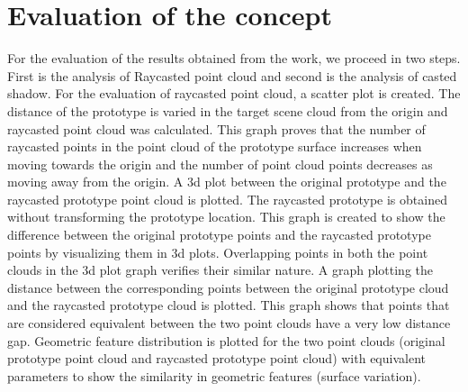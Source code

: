 \chapter{Evaluation of the concept}
For the evaluation of the results obtained from the work, we proceed in two steps. First is the analysis of Raycasted point cloud and second is the analysis of casted shadow. For the evaluation of raycasted point cloud, a scatter plot is created. The distance of the prototype is varied in the target scene cloud from the origin and raycasted point cloud was calculated. This graph proves that the number of raycasted points in the point cloud of the prototype surface increases when moving towards the origin and the number of point cloud points decreases as moving away from the origin. A 3d plot between the original prototype and the raycasted prototype point cloud is plotted. The raycasted prototype is obtained without transforming the prototype location. This graph is created to show the difference between the original prototype points and the raycasted prototype points by visualizing them in 3d plots. Overlapping points in both the point clouds in the 3d plot graph verifies their similar nature. A graph plotting the distance between the corresponding points between the original prototype cloud and the raycasted prototype cloud is plotted. This graph shows that points that are considered equivalent between the two point clouds have a very low distance gap. Geometric feature distribution is plotted for the two point clouds (original prototype point cloud and raycasted prototype point cloud) with equivalent parameters to show the similarity in geometric features (surface variation).

